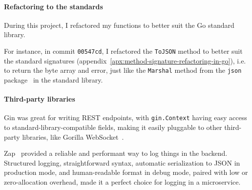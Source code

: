 \paragraph*{Refactoring to the standards}\label{par:refactoring-to-the-standards}

During this project,
I refactored my functions to better suit
the Go standard library.

For instance,
in commit \texttt{00547cd},
I refactored the \texttt{ToJSON} method
to better suit the standard signatures
(appendix~\ref{apx:method-signature-refactoring-in-go}),
i.e. to return the byte array and error,
just like the \texttt{Marshal} method
from the \texttt{json} package~\cite{cox_json_2022}
in the standard library.

\paragraph*{Third-party libraries}\label{par:third-party-libraries}

Gin was great for writing REST endpoints,
with \texttt{gin.Context} having easy access to
standard-library-compatible fields,
making it easily pluggable to other third-party libraries,
like Gorilla WebSocket~\cite{burd_gorilla_2022}.

Zap~\cite{shah_zap_2022} provided a reliable
and performant way to log things in the backend.
Structured logging,
straightforward syntax,
automatic serialization to JSON in production mode,
and human-readable format in debug mode,
paired with low or zero-allocation overhead,
made it a perfect choice for logging in a microservice.

